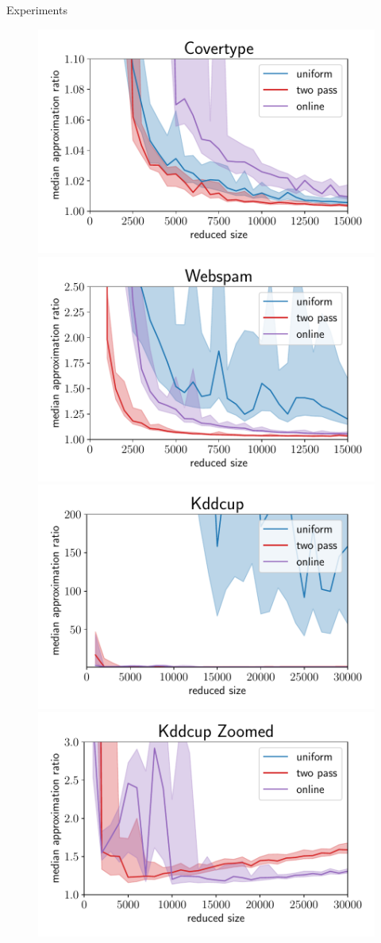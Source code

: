 \documentclass[gray]{beamer}
\begin{document}
\begin{frame}{Experiments}
    \begin{figure}[ht!]
        \centering
        \includegraphics[width=.49\linewidth]{../figures/covertype_ratio_plot.pdf}
        \includegraphics[width=.49\linewidth]{../figures/webspam_ratio_plot.pdf}
        \includegraphics[width=.49\linewidth]{../figures/kddcup_ratio_plot.pdf}
        \includegraphics[width=.49\linewidth]{../figures/kddcup_ratio_plot_zoomed.pdf}
    \end{figure}
\end{frame}
\end{document}
